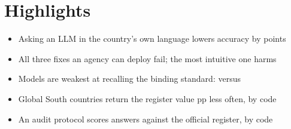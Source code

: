 \documentclass[11pt,a4paper]{article}
\begin{document}
\section*{Highlights}

\begin{itemize}
\item Asking an LLM in the country's own language lowers accuracy by \nnativa{} points
\item All three fixes an agency can deploy fail; the most intuitive one harms
\item Models are weakest at recalling the binding standard: \ntasktoneshort{} versus \nfloorrestshort{}
\item Global South countries return the register value \ncodegapabs{} pp less often, by code
\item An audit protocol scores answers against the official register, by code
\end{itemize}
\end{document}
